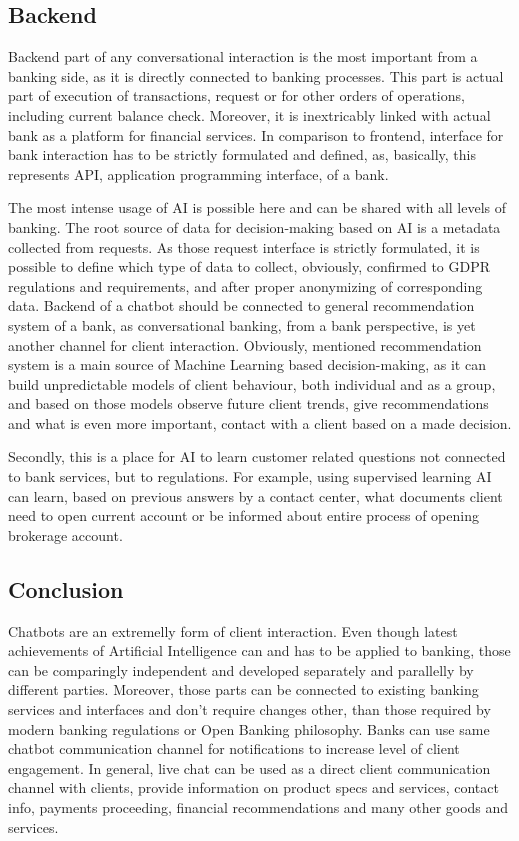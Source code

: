 \subsection{Backend}

Backend part of any conversational interaction is the most important from a banking side, as it is directly connected to banking processes.
This part is actual part of execution of transactions, request or for other orders of operations, including current balance check.
Moreover, it is inextricably linked with actual bank as a platform for financial services.
In comparison to frontend, interface for bank interaction has to be strictly formulated and defined, as, basically, this represents API, application programming interface, of a bank.

The most intense usage of AI is possible here and can be shared with all levels of banking.
The root source of data for decision-making based on AI is a metadata collected from requests.
As those request interface is strictly formulated, it is possible to define which type of data to collect, obviously, confirmed to GDPR regulations and requirements, and after proper anonymizing of corresponding data.
Backend of a chatbot should be connected to general recommendation system of a bank, as conversational banking, from a bank perspective, is yet another channel for client interaction.
Obviously, mentioned recommendation system is a main source of Machine Learning based decision-making, as it can build unpredictable models of client behaviour, both individual and as a group, and based on those models observe future client trends, give recommendations and what is even more important, contact with a client based on a made decision.

Secondly, this is a place for AI to learn customer related questions not connected to bank services, but to regulations.
For example, using supervised learning AI can learn, based on previous answers by a contact center, what documents client need to open current account or be informed about entire process of opening brokerage account.


\subsection{Conclusion}

Chatbots are an extremelly form of client interaction.
Even though latest achievements of Artificial Intelligence can and has to be applied to banking, those can be comparingly independent and developed separately and parallelly by different parties.
Moreover, those parts can be connected to existing banking services and interfaces and don't require changes other, than those required by modern banking regulations or Open Banking philosophy.
Banks can use same chatbot communication channel for notifications to increase level of client engagement.
In general, live chat can be used as a direct client communication channel with clients, provide information on product specs and services, contact info, payments proceeding, financial recommendations and many other goods and services.

